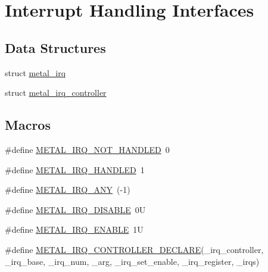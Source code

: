 \hypertarget{group__irq}{}\section{Interrupt Handling Interfaces}
\label{group__irq}
\subsection*{Data Structures}
\begin{DoxyCompactItemize}
\item 
struct \hyperlink{structmetal__irq}{metal\+\_\+irq}
\item 
struct \hyperlink{structmetal__irq__controller}{metal\+\_\+irq\+\_\+controller}
\end{DoxyCompactItemize}
\subsection*{Macros}
\begin{DoxyCompactItemize}
\item 
\#define \hyperlink{group__irq_ga45bd2c2be4c4788772f18742664097b0}{M\+E\+T\+A\+L\+\_\+\+I\+R\+Q\+\_\+\+N\+O\+T\+\_\+\+H\+A\+N\+D\+L\+ED}~0
\item 
\#define \hyperlink{group__irq_ga243d0514334619fc51d7029840ce2720}{M\+E\+T\+A\+L\+\_\+\+I\+R\+Q\+\_\+\+H\+A\+N\+D\+L\+ED}~1
\item 
\#define \hyperlink{group__irq_ga012dfdc4397683c22caa93075b01be52}{M\+E\+T\+A\+L\+\_\+\+I\+R\+Q\+\_\+\+A\+NY}~(-\/1)
\item 
\#define \hyperlink{group__irq_ga1cc45f7942dbbca274f2d7822b7d7df0}{M\+E\+T\+A\+L\+\_\+\+I\+R\+Q\+\_\+\+D\+I\+S\+A\+B\+LE}~0U
\item 
\#define \hyperlink{group__irq_ga007398d79afac4c5840f958013b9c823}{M\+E\+T\+A\+L\+\_\+\+I\+R\+Q\+\_\+\+E\+N\+A\+B\+LE}~1U
\item 
\#define \hyperlink{group__irq_ga459298e318433ee817bf50dbd02d4534}{M\+E\+T\+A\+L\+\_\+\+I\+R\+Q\+\_\+\+C\+O\+N\+T\+R\+O\+L\+L\+E\+R\+\_\+\+D\+E\+C\+L\+A\+RE}(\+\_\+irq\+\_\+controller,  \+\_\+irq\+\_\+base,  \+\_\+irq\+\_\+num,  \+\_\+arg,  \+\_\+irq\+\_\+set\+\_\+enable,  \+\_\+irq\+\_\+register,  \+\_\+irqs)
\end{DoxyCompactItemize}
